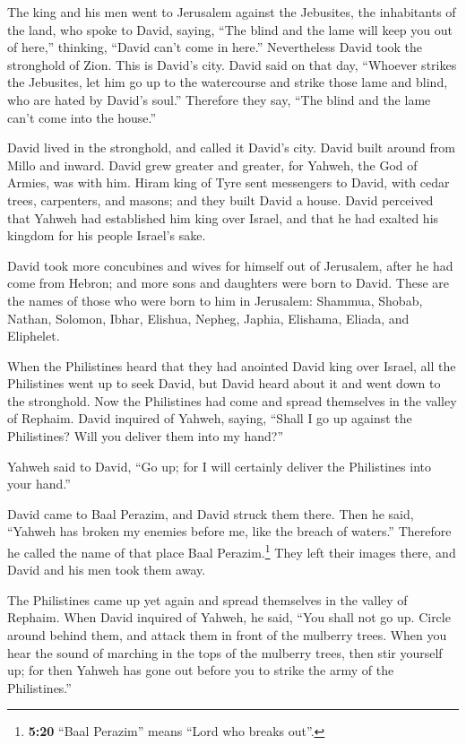  The king and his men went to Jerusalem against the
Jebusites, the inhabitants of the land, who spoke to David, saying,
``The blind and the lame will keep you out of here,'' thinking, ``David
can't come in here.''  Nevertheless David took the
stronghold of Zion. This is David's city.  David said on
that day, ``Whoever strikes the Jebusites, let him go up to the
watercourse and strike those lame and blind, who are hated by David's
soul.'' Therefore they say, ``The blind and the lame can't come into the
house.''

 David lived in the stronghold, and called it David's
city. David built around from Millo and inward.  David
grew greater and greater, for Yahweh, the God of Armies, was with him.
 Hiram king of Tyre sent messengers to David, with cedar
trees, carpenters, and masons; and they built David a house.
 David perceived that Yahweh had established him king
over Israel, and that he had exalted his kingdom for his people Israel's
sake.

 David took more concubines and wives for himself out of
Jerusalem, after he had come from Hebron; and more sons and daughters
were born to David.  These are the names of those who
were born to him in Jerusalem: Shammua, Shobab, Nathan, Solomon,
 Ibhar, Elishua, Nepheg, Japhia, 
Elishama, Eliada, and Eliphelet.

 When the Philistines heard that they had anointed David
king over Israel, all the Philistines went up to seek David, but David
heard about it and went down to the stronghold.  Now the
Philistines had come and spread themselves in the valley of Rephaim.
 David inquired of Yahweh, saying, ``Shall I go up
against the Philistines? Will you deliver them into my hand?''

Yahweh said to David, ``Go up; for I will certainly deliver the
Philistines into your hand.''

 David came to Baal Perazim, and David struck them there.
Then he said, ``Yahweh has broken my enemies before me, like the breach
of waters.'' Therefore he called the name of that place Baal
Perazim.\footnote{\textbf{5:20} ``Baal Perazim'' means ``Lord who breaks
  out''.}  They left their images there, and David and
his men took them away.

 The Philistines came up yet again and spread themselves
in the valley of Rephaim.  When David inquired of Yahweh,
he said, ``You shall not go up. Circle around behind them, and attack
them in front of the mulberry trees.  When you hear the
sound of marching in the tops of the mulberry trees, then stir yourself
up; for then Yahweh has gone out before you to strike the army of the
Philistines.''

